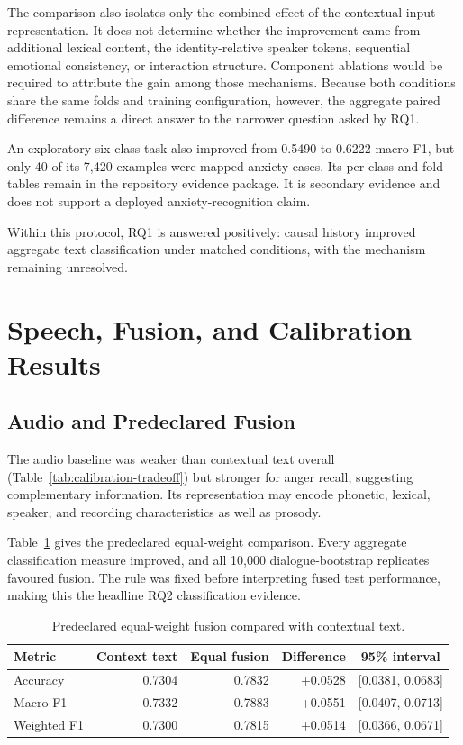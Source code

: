 The comparison also isolates only the combined effect of the contextual input representation. It does not determine whether the improvement came from additional lexical content, the identity-relative speaker tokens, sequential emotional consistency, or interaction structure. Component ablations would be required to attribute the gain among those mechanisms. Because both conditions share the same folds and training configuration, however, the aggregate paired difference remains a direct answer to the narrower question asked by RQ1.

An exploratory six-class task also improved from 0.5490 to 0.6222 macro F1, but only 40 of its 7,420 examples were mapped anxiety cases. Its per-class and fold tables remain in the repository evidence package. It is secondary evidence and does not support a deployed anxiety-recognition claim.

Within this protocol, RQ1 is answered positively: causal history improved aggregate text classification under matched conditions, with the mechanism remaining unresolved.

\section{Speech, Fusion, and Calibration Results}
\label{sec:multimodal-results}

\subsection{Audio and Predeclared Fusion}
\label{subsec:equal-fusion-results}

The audio baseline was weaker than contextual text overall (Table~\ref{tab:calibration-tradeoff}) but stronger for anger recall, suggesting complementary information. Its representation may encode phonetic, lexical, speaker, and recording characteristics as well as prosody.

Table~\ref{tab:equal-fusion-results} gives the predeclared equal-weight comparison. Every aggregate classification measure improved, and all 10,000 dialogue-bootstrap replicates favoured fusion. The rule was fixed before interpreting fused test performance, making this the headline RQ2 classification evidence.

\begin{table}[htbp]
\centering
\caption{Predeclared equal-weight fusion compared with contextual text.}
\label{tab:equal-fusion-results}
\footnotesize
\begin{tabular}{|l|r|r|r|c|}
\hline
\textbf{Metric} & \textbf{Context text} & \textbf{Equal fusion} & \textbf{Difference} & \textbf{95\% interval} \\ \hline
Accuracy & 0.7304 & 0.7832 & +0.0528 & [0.0381, 0.0683] \\ \hline
Macro F1 & 0.7332 & 0.7883 & +0.0551 & [0.0407, 0.0713] \\ \hline
Weighted F1 & 0.7300 & 0.7815 & +0.0514 & [0.0366, 0.0671] \\ \hline
\end{tabular}
\end{table}

